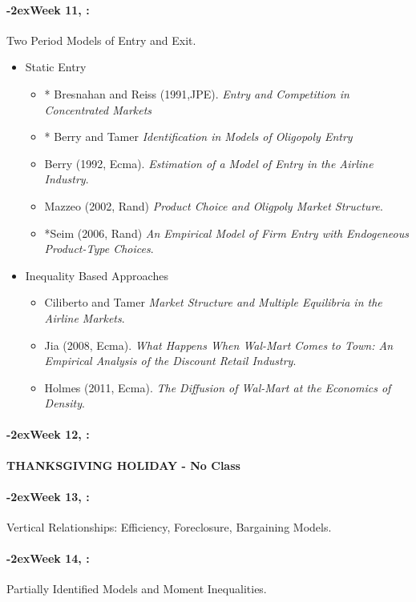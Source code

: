 \documentclass[11pt]{article}
\newcommand{\week}[1]{%
  \paragraph*{\kern-2ex\quad #1, \syldate{\today}:}%
  \ifdim\wd1=\wd\THURSDAY
    \AdvanceDate[7]
  \else
    \AdvanceDate[7]
  \fi%
}
\begin{document}
\week{Week 11} Two Period Models of Entry and Exit.
\begin{itemize}
\item Static Entry
\begin{itemize}
\item * Bresnahan and Reiss (1991,JPE). \textit{Entry and Competition in Concentrated Markets}
\item * Berry and Tamer \textit{Identification in Models of Oligopoly Entry}
\item Berry (1992, Ecma). \textit{Estimation of a Model of Entry in the Airline Industry}.
\item Mazzeo (2002, Rand) \textit{Product Choice and Oligpoly Market Structure}.
\item *Seim (2006, Rand) \textit{ An Empirical Model of Firm Entry with Endogeneous Product-Type Choices}.
\end{itemize}
\item Inequality Based Approaches
\begin{itemize}
\item Ciliberto and Tamer \textit{Market Structure and Multiple Equilibria in the Airline Markets}.
\item Jia (2008, Ecma). \textit{What Happens When Wal-Mart Comes to Town: An Empirical Analysis of the Discount Retail Industry}.
\item Holmes (2011, Ecma). \textit{The Diffusion of Wal-Mart at the Economics of Density}.
\end{itemize}
\end{itemize}

\week{Week 12} \textbf{THANKSGIVING HOLIDAY - No Class}
\week{Week 13} Vertical Relationships: Efficiency, Foreclosure, Bargaining Models.
\week{Week 14} Partially Identified Models and Moment Inequalities.
\end{document}
